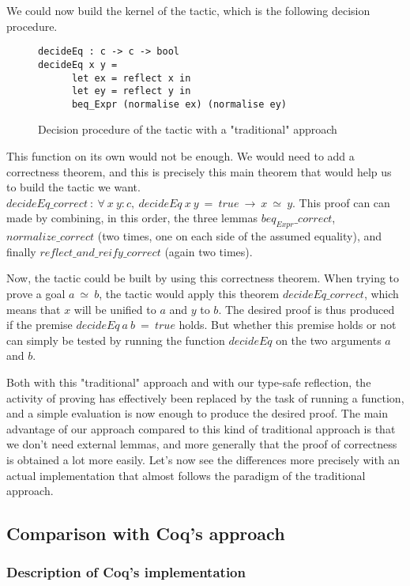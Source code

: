 We could now build the kernel of the tactic, which is the following decision procedure. 
\begin{figure}[H]
\figrule
\begin{center}
\begin{verbatim}
decideEq : c -> c -> bool 
decideEq x y =
      let ex = reflect x in 
      let ey = reflect y in
      beq_Expr (normalise ex) (normalise ey)
\end{verbatim}
\end{center}
\caption{Decision procedure of the tactic with a "traditional" approach}
\figrule
\end{figure}
This function on its own would not  be enough. We would need to add a correctness theorem, and this is precisely this main theorem that would help us to build the tactic we want.	
$decideEq\_correct\ :\ \forall\  x\ y:c,\ decideEq\ x\ y\ =\ true\ \rightarrow\ x\  \simeq\ y$. This proof can can made by combining, in this order, the three lemmas $beq_{Expr}\_correct$, $normalize\_correct$ (two times, one on each side of the assumed equality), and finally $reflect\_and\_reify\_correct$ (again two times).

Now, the tactic could be built by using this correctness theorem. When trying to prove a goal $a\ \simeq \ b$, the tactic would apply this theorem $decideEq\_correct$, which means that $x$ will be unified to $a$ and $y$ to $b$. The desired proof is thus produced if the premise $decideEq\ a\ b\ =\ true$ holds. But whether this premise holds or not can simply be tested by running the function $decideEq$ on the two arguments $a$ and $b$. 

Both with this "traditional" approach and with our type-safe reflection, the activity of proving has effectively been replaced by the task of running a function, and a simple evaluation is now enough to produce the desired proof. The main advantage of our approach compared to this kind of traditional approach is that we don't need external lemmas, and more generally that the proof of correctness is obtained a lot more easily. Let's now see the differences more precisely with an actual implementation that almost follows the paradigm of the traditional approach.

	\subsection {Comparison with Coq's approach}
	
		\subsubsection{Description of Coq's implementation}	
	
